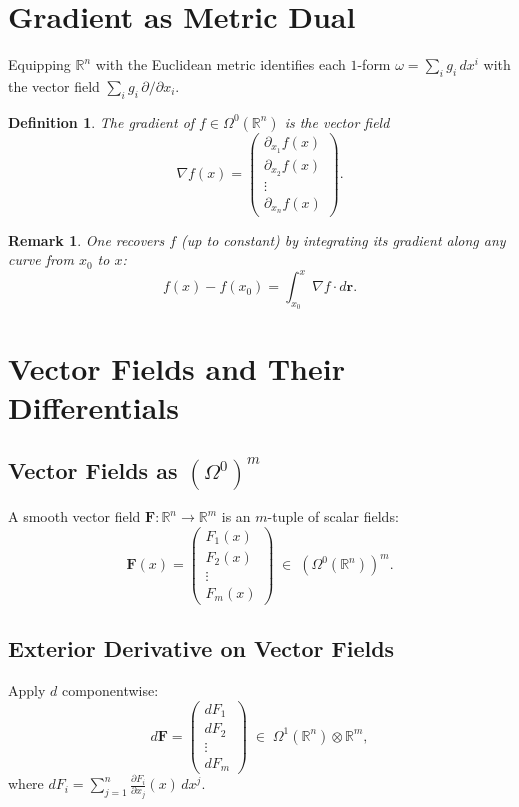 \documentclass[12pt]{article}
\theoremstyle{definitionstyle}
\newtheorem{definition}{Definition} %
\newtheorem{remark}{Remark} %
\newcommand{\R}{\mathbb{R}}
\begin{document}
\bigskip

\section{Gradient as Metric Dual}

Equipping \(\R^n\) with the Euclidean metric identifies each \(1\)-form
\(\omega=\sum_i g_i\,dx^i\)
with the vector field
\(\sum_i g_i\,\partial/\partial x_i\).

\begin{definition}
	The \emph{gradient} of \(f\in\Omega^0(\R^n)\) is the vector field
	\[
	\nabla f(x)
	=\begin{pmatrix}
		\partial_{x_1}f(x)\\
		\partial_{x_2}f(x)\\
		\vdots\\
		\partial_{x_n}f(x)
	\end{pmatrix}.
	\]
\end{definition}

\begin{remark}
	One recovers \(f\) (up to constant) by integrating its gradient along any curve from \(x_0\) to \(x\):
	\[
	f(x)-f(x_0)
	=\int_{x_0}^x \nabla f\cdot d\mathbf r.
	\]
\end{remark}

\bigskip

\section{Vector Fields and Their Differentials}

\subsection{Vector Fields as \((\Omega^0)^m\)}

A smooth vector field
\(\mathbf F:\R^n\to\R^m\)
is an \(m\)-tuple of scalar fields:
\[
\mathbf F(x)
=\begin{pmatrix}F_1(x)\\F_2(x)\\\vdots\\F_m(x)\end{pmatrix}
\;\in\;(\Omega^0(\R^n))^m.
\]

\subsection{Exterior Derivative on Vector Fields}

Apply \(d\) componentwise:
\[
d\mathbf F
=\begin{pmatrix}dF_1\\dF_2\\\vdots\\dF_m\end{pmatrix}
\;\in\;\Omega^1(\R^n)\otimes\R^m,
\]
where
\(\displaystyle dF_i=\sum_{j=1}^n\frac{\partial F_i}{\partial x_j}(x)\,dx^j.\)
\end{document}
